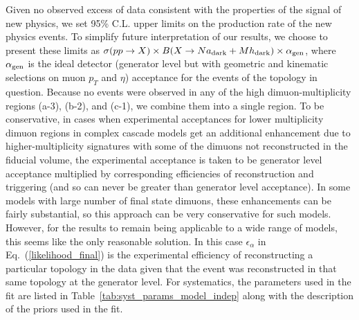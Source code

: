 Given no observed excess of data consistent with the properties of the signal of new physics, we set 95\% C.L. upper limits on the production rate of the new physics events. To simplify future interpretation of our results, we choose to present these limits as $\sigma(pp \to X) \times B(X \to N a_{\mbox{\scriptsize dark}}+M h_{\mbox{\scriptsize dark}}) \times \alpha_{\mbox{\scriptsize gen}}$, where $\alpha_{\mbox{\scriptsize gen}}$ is the ideal detector (generator level but with geometric and kinematic selections on muon $p_T$ and $\eta$) acceptance for the events of the topology in question. Because no events were observed in any of the high dimuon-multiplicity regions (a-3), (b-2), and (c-1), we combine them into a single region.  To be conservative, in cases when experimental acceptances for lower multiplicity dimuon regions in complex cascade models get an additional enhancement due to higher-multiplicity signatures with some of the dimuons not reconstructed in the fiducial volume, the experimental acceptance is taken to be generator level acceptance multiplied by corresponding efficiencies of reconstruction and triggering (and so can never be greater than generator level acceptance). In some models with large number of final state dimuons, these enhancements can be fairly substantial, so this approach can be very conservative for such models. However, for the results to remain being applicable to a wide range of models, this seems like the only reasonable solution. In this case $\epsilon_\alpha$ in Eq.~(\ref{likelihood_final}) is the experimental efficiency of reconstructing a particular topology in the data given that the event was reconstructed in that same topology at the generator level. For systematics, the parameters used in the fit are listed in Table~\ref{tab:syst_params_model_indep} along with the description of the priors used in the fit.

